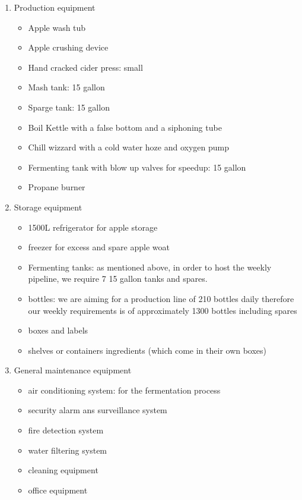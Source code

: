 \documentclass[11pt]{article}
\begin{document}
    \begin{enumerate}
    \item Production equipment
      \begin{itemize}
      \item Apple wash tub
      \item Apple crushing device
      \item Hand cracked cider press: small
      \item Mash tank: 15 gallon
      \item Sparge tank: 15 gallon
      \item Boil Kettle with a false bottom and a siphoning tube
      \item Chill wizzard with a cold water hoze and oxygen pump
      \item Fermenting tank with blow up valves for speedup: 15 gallon
      \item Propane burner
      \end{itemize}

    \item Storage equipment
      \begin{itemize}
      \item 1500L refrigerator for apple storage
      \item freezer for excess and spare apple woat
      \item Fermenting tanks: as mentioned above, in order to host the weekly
pipeline, we require 7 15 gallon tanks and spares.
      \item bottles: we are aiming for a production line of 210 bottles daily
therefore our weekly requirements is of approximately 1300 bottles including
spares
      \item boxes and labels
      \item shelves or containers ingredients (which come in their own boxes)
      \end{itemize}

    \item General maintenance equipment
      \begin{itemize}
      \item air conditioning system: for the fermentation process
      \item security alarm ans surveillance system
      \item fire detection system
      \item water filtering system
      \item cleaning equipment
      \item office equipment
      \end{itemize}
    \end{enumerate}
\end{document}
